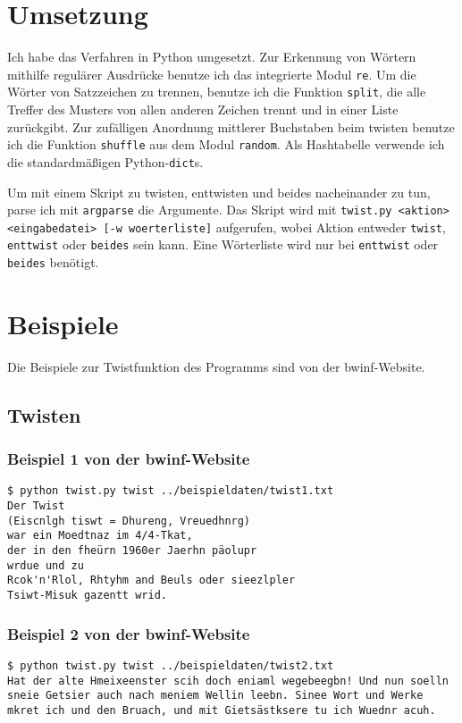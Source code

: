 \documentclass[a4paper,10pt,ngerman]{scrartcl}
\begin{document}
\section{Umsetzung}
Ich habe das Verfahren in Python umgesetzt. Zur Erkennung von Wörtern mithilfe regulärer Ausdrücke benutze ich das integrierte Modul \texttt{re}. Um die Wörter von Satzzeichen zu trennen, benutze ich die Funktion \texttt{split}, die alle Treffer des Musters von allen anderen Zeichen trennt und in einer Liste zurückgibt. Zur zufälligen Anordnung mittlerer Buchstaben beim twisten benutze ich die Funktion \texttt{shuffle} aus dem Modul \texttt{random}. Als Hashtabelle verwende ich die standardmäßigen Python-\texttt{dict}s. 

Um mit einem Skript zu twisten, enttwisten und beides nacheinander zu tun, parse ich mit \texttt{argparse} die Argumente. Das Skript wird mit \texttt{twist.py <aktion> <eingabedatei> [-w woerterliste]} aufgerufen, wobei Aktion entweder \texttt{twist}, \texttt{enttwist} oder \texttt{beides} sein kann. Eine Wörterliste wird nur bei \texttt{enttwist} oder \texttt{beides} benötigt.

\section{Beispiele}
Die Beispiele zur Twistfunktion des Programms sind von der bwinf-Website.

\subsection{Twisten}
\label{beispiel:twisten}

\vspace{10pt}
\subsubsection{Beispiel 1 von der bwinf-Website}
\label{beispiel:twisten:1}
\begin{lstlisting}[breaklines=true]
$ python twist.py twist ../beispieldaten/twist1.txt 
Der Twist  
(Eiscnlgh tiswt = Dhureng, Vreuedhnrg)  
war ein Moedtnaz im 4/4-Tkat,  
der in den fheürn 1960er Jaerhn päolupr  
wrdue und zu  
Rcok'n'Rlol, Rhtyhm and Beuls oder sieezlpler 
Tsiwt-Misuk gazentt wrid.
\end{lstlisting}

\vspace{10pt}
\subsubsection{Beispiel 2 von der bwinf-Website}
\label{beispiel:twisten:2}
\begin{lstlisting}[breaklines=true]
  $ python twist.py twist ../beispieldaten/twist2.txt 
Hat der alte Hmeixeenster scih doch eniaml wegebeegbn! Und nun soelln sneie Getsier auch nach meniem Wellin leebn. Sinee Wort und Werke mkret ich und den Bruach, und mit Gietsästksere tu ich Wuednr acuh.
\end{lstlisting}
\end{document}

